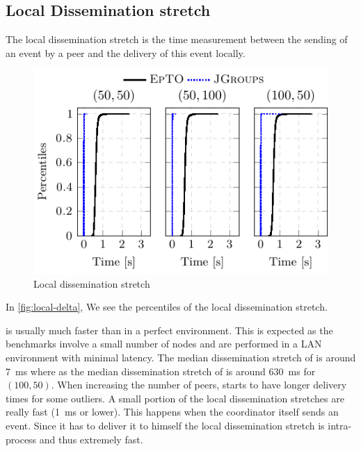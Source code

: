 \subsection{Local Dissemination stretch}
The local dissemination stretch is the time measurement between the sending of an event by a peer and the delivery of this event locally.
 \begin{figure}[hpt]
 	\centering
 	\includegraphics[width=\linewidth]{figures/local-diss-stretch-nochurn.pdf}
 	\vspace{-2mm} 
 	\caption{Local dissemination stretch}
 	\vspace{-2mm}
 	\label{fig:local-delta}  
 \end{figure}
In \autoref{fig:local-delta}, We see the percentiles of the local dissemination stretch.
\par
\jgroups is usually much faster than \epto in a perfect environment. This is expected as the benchmarks involve a small number of nodes and are performed in a LAN environment with minimal latency. The median dissemination stretch of \jgroups is around \SI{7}{\milli\second} where as the median dissemination stretch of \epto is around \SI{630}{\milli\second} for $(100,50)$. When increasing the number of peers, \jgroups starts to have longer delivery times for some outliers. A small portion of the local dissemination stretches are really fast (\SI{1}{\milli\second} or lower). This happens when the coordinator itself sends an event. Since it has to deliver it to himself the local dissemination stretch is intra-process and thus extremely fast.

